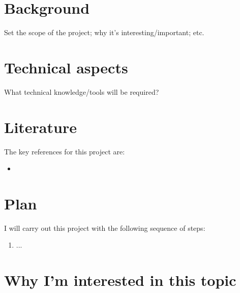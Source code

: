 \documentclass[]{STAT_547C}
\begin{document}
\vspace{-2cm}


\section{Background}

Set the scope of the project; why it's interesting/important; etc.

\section{Technical aspects}

What technical knowledge/tools will be required?


\section{Literature}

The key references for this project are:

\begin{itemize}
  \item \cite{}
\end{itemize}


\section{Plan}

I will carry out this project with the following sequence of steps: 
\begin{enumerate}
  \item ...
\end{enumerate}


\section{Why I'm interested in this topic}



\printbibliography
\end{document}
